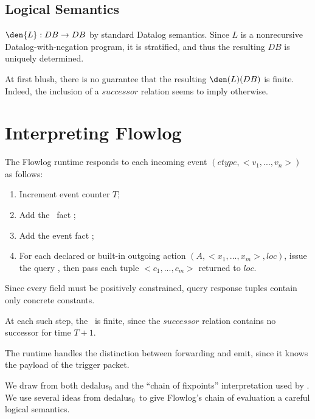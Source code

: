 \subsection{Logical Semantics}

$\den{L}: DB \rightarrow DB$ by standard Datalog semantics. Since $L$
is a nonrecursive Datalog-with-negation program, it is stratified, and
thus the resulting $DB$ is uniquely determined. 

At first blush, there is no guarantee that the resulting $\den(L)(DB)$
is finite. Indeed, the inclusion of a $successor$ relation seems to
imply otherwise. 








\section{Interpreting Flowlog}

The Flowlog runtime responds to each incoming event $(etype, <v_1,
..., v_n>)$ as follows:

\begin{enumerate}
\item Increment event counter $T$;
\item Add the \edb\ fact ;
\item Add the event fact ;
\item For each declared or built-in outgoing action $(A, <x_1, ...,
  x_m>, loc)$, issue the query , then pass each
  tuple $<c_1, ..., c_m>$ returned to $loc$. 
\end{enumerate}

\noindent Since every field must be positively constrained, query
response tuples contain only concrete constants. 

At each such step, the \edb\ is finite, since the $successor$ relation
contains no successor for time $T+1$.

The runtime handles the distinction between forwarding and emit, since
it knows the payload of the trigger packet.

\newcommand{\dedalus}{{\sc dedalus}$_0$}

We draw from both \dedalus\cite{} and the ``chain of fixpoints''
interpretation used by \ndlog\cite{}. We use several ideas from
\dedalus\ to give Flowlog's chain of evaluation a careful logical
semantics.



